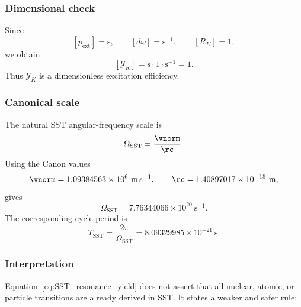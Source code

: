     \subsubsection*{Dimensional check}
        
        Since
        \[
            [p_{\mathrm{ext}}]=\mathrm{s},
            \qquad
            [d\omega]=\mathrm{s}^{-1},
            \qquad
            [R_K]=1,
        \]
        we obtain
        \[
            [\mathcal{Y}_K]
            =
            \mathrm{s}\cdot 1 \cdot \mathrm{s}^{-1}
            =
            1.
        \]
        Thus \(\mathcal{Y}_K\) is a dimensionless excitation efficiency.
    
    \subsubsection*{Canonical scale}
        
        The natural SST angular-frequency scale is
        \begin{equation}
            \Omega_{\mathrm{SST}}
            =
            \frac{\vnorm}{\rc}.
            \label{eq:Omega_SST_scale}
        \end{equation}
        Using the Canon values
        \[
            \vnorm = 1.09384563\times10^{6}\ \mathrm{m\,s^{-1}},
            \qquad
            \rc = 1.40897017\times10^{-15}\ \mathrm{m},
        \]
        gives
        \begin{equation}
            \Omega_{\mathrm{SST}}
            =
            7.76344066\times10^{20}\ \mathrm{s^{-1}}.
            \label{eq:Omega_SST_numeric}
        \end{equation}
        The corresponding cycle period is
        \begin{equation}
            T_{\mathrm{SST}}
            =
            \frac{2\pi}{\Omega_{\mathrm{SST}}}
            =
            8.09329985\times10^{-21}\ \mathrm{s}.
            \label{eq:T_SST_numeric}
        \end{equation}
    
    \subsubsection*{Interpretation}
        
        Equation~\eqref{eq:SST_resonance_yield} does not assert that all nuclear, atomic, or particle transitions are already derived in SST. It states a weaker and safer rule:
        
